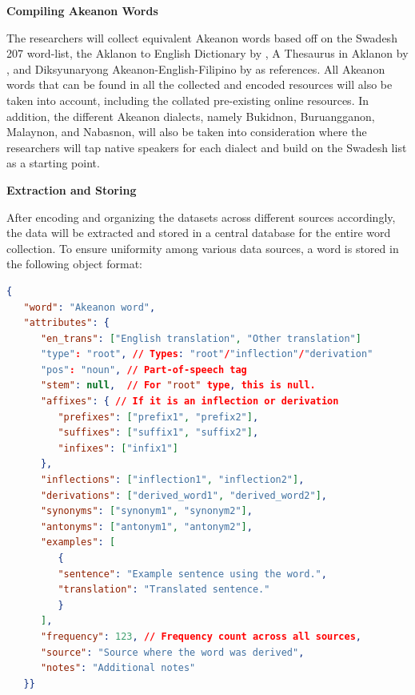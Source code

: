 \textbf{Compiling Akeanon Words}

The researchers will collect equivalent Akeanon words based off on the Swadesh 207 word-list, the Aklanon to English Dictionary by , A Thesaurus in Aklanon by , and Diksyunaryong Akeanon-English-Filipino by  as references. All Akeanon words that can be found in all the collected and encoded resources will also be taken into account, including the collated pre-existing online resources. In addition, the different Akeanon dialects, namely Bukidnon, Buruangganon, Malaynon, and Nabasnon, will also be taken into consideration where the researchers will tap native speakers for each dialect and build on the Swadesh list as a starting point.



\textbf{Extraction and Storing}

After encoding and organizing the datasets across different sources accordingly, the data will be extracted and stored in a central database for the entire word collection. To ensure uniformity among various data sources, a word is stored in the following object format:

\begin{lstlisting}[language=json, caption=Object structure for storing a word, breaklines=true]
   {
   "word": "Akeanon word",
   "attributes": {
      "en_trans": ["English translation", "Other translation"]
      "type": "root", // Types: "root"/"inflection"/"derivation"
      "pos": "noun", // Part-of-speech tag
      "stem": null,  // For "root" type, this is null.
      "affixes": { // If it is an inflection or derivation
         "prefixes": ["prefix1", "prefix2"],
         "suffixes": ["suffix1", "suffix2"],
         "infixes": ["infix1"]
      },
      "inflections": ["inflection1", "inflection2"],  
      "derivations": ["derived_word1", "derived_word2"],
      "synonyms": ["synonym1", "synonym2"],
      "antonyms": ["antonym1", "antonym2"],
      "examples": [
         {
         "sentence": "Example sentence using the word.",
         "translation": "Translated sentence."
         }
      ],
      "frequency": 123, // Frequency count across all sources,
      "source": "Source where the word was derived",
      "notes": "Additional notes"
   }}

\end{lstlisting}

